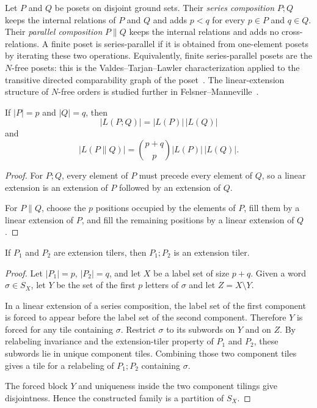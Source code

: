 Let $P$ and $Q$ be posets on disjoint ground sets.  Their
\emph{series composition} $P;Q$ keeps the internal relations of $P$ and
$Q$ and adds $p<q$ for every $p\in P$ and $q\in Q$.  Their
\emph{parallel composition} $P\|Q$ keeps the internal relations and adds
no cross-relations.  A finite poset is series-parallel if it is obtained
from one-element posets by iterating these two operations.  Equivalently,
finite series-parallel posets are the $N$-free posets: this is the
Valdes--Tarjan--Lawler characterization applied to the transitive directed
comparability graph of the poset~\cite{ValdesTarjanLawler1982}.  The
linear-extension structure of $N$-free orders is studied further in
Felsner--Manneville~\cite{FelsnerManneville2015}.

\begin{lemma}
\label{lem:extension-counts}
If $|P|=p$ and $|Q|=q$, then
\[
        |L(P;Q)|=|L(P)|\,|L(Q)|
\]
and
\[
        |L(P\|Q)|=\binom{p+q}{p}|L(P)|\,|L(Q)|.
\]
\end{lemma}

\begin{proof}
For $P;Q$, every element of $P$ must precede every element of $Q$, so a
linear extension is an extension of $P$ followed by an extension of $Q$.

For $P\|Q$, choose the $p$ positions occupied by the elements of $P$,
fill them by a linear extension of $P$, and fill the remaining positions
by a linear extension of $Q$.
\end{proof}

\begin{lemma}
\label{lem:series-closure}
If $P_1$ and $P_2$ are extension tilers, then $P_1;P_2$ is an extension
tiler.
\end{lemma}

\begin{proof}
Let $|P_1|=p$, $|P_2|=q$, and let $X$ be a label set of size $p+q$.
Given a word $\sigma\in S_X$, let $Y$ be the set of the first $p$ letters
of $\sigma$ and let $Z=X\setminus Y$.

In a linear extension of a series composition, the label set of the first
component is forced to appear before the label set of the second
component.  Therefore $Y$ is forced for any tile containing $\sigma$.
Restrict $\sigma$ to its subwords on $Y$ and on $Z$.  By relabeling
invariance and the extension-tiler property of $P_1$ and $P_2$, these
subwords lie in unique component tiles.  Combining those two component
tiles gives a tile for a relabeling of $P_1;P_2$ containing $\sigma$.

The forced block $Y$ and uniqueness inside the two component tilings give
disjointness.  Hence the constructed family is a partition of $S_X$.
\end{proof}

